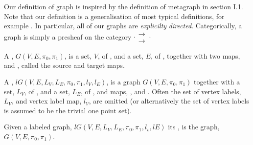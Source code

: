 \documentclass[a4paper,openany]{amsart}
\begin{document}
Our definition of graph is inspired by the definition of metagraph in
\cite{macLane1971categoriesWorkingMathematician} section I.1. Note that our definition is
a generalisation of most typical definitions, for example \cite[section
1.1]{diestel2006graphTheory}. In particular, all of our graphs are \emph{explicilty}
\emph{directed}. Categorically, a graph is simply a presheaf on the category
$ \cdot \substack{\mathbf{\longrightarrow} \\[-0.7ex] \mathbf{\longrightarrow}} \cdot $

\begin{definition}

A , $G(V, E, \pi_0, \pi_1)$, is a set, $V$, of , and a
set, $E$, of , together with two maps,  and
, called the source and target maps.

A , $lG(V, E, L_V, L_E, \pi_0, \pi_1, l_V, l_E)$, is a graph $G(V,
E, \pi_0, \pi_1)$ together with a set, $L_V$, of , and a set,
$L_E$, of , and maps, , and .
Often the set of vertex labels, $L_V$, and vertex label map, $l_V$, are omitted (or
alternatively the set of vertex labels is assumed to be the trivial one point set).

Given a labeled graph, $lG(V, E, L_V, L_E, \pi_0, \pi_1, l_v, lE)$ its , is the graph, $G(V, E, \pi_0, \pi_1)$.

\end{definition}
\end{document}

